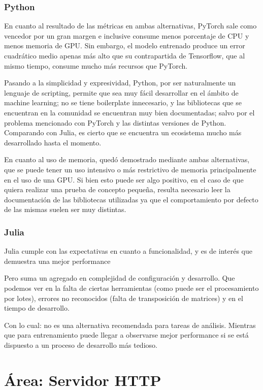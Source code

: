 \documentclass[11pt]{article}
\let\Oldsection\section
\renewcommand{\section}{\FloatBarrier\Oldsection}
\let\Oldsubsubsection\subsubsection
\renewcommand{\subsubsection}{\FloatBarrier\Oldsubsubsection}
\begin{document}
\subsubsection{Python}

En cuanto al resultado de las métricas en ambas alternativas, PyTorch sale como vencedor por un gran margen e inclusive consume menos porcentaje de CPU y menos memoria de GPU. Sin embargo, el modelo entrenado produce un error cuadrático medio apenas más alto que su contrapartida de Tensorflow, que al mismo tiempo, consume mucho más recursos que PyTorch.

Pasando a la simplicidad y expresividad, Python, por ser naturalmente un lenguaje de scripting, permite que sea muy fácil desarrollar en el ámbito de machine learning; no se tiene boilerplate innecesario, y las bibliotecas que se encuentran en la comunidad se encuentran muy bien documentadas; salvo por el problema mencionado con PyTorch y las distintas versiones de Python. Comparando con Julia, es cierto que se encuentra un ecosistema mucho más desarrollado hasta el momento.

En cuanto al uso de memoria, quedó demostrado mediante ambas alternativas, que se puede tener un uso intensivo o más restrictivo de memoria principalmente en el uso de una GPU. Si bien esto puede ser algo positivo, en el caso de que quiera realizar una prueba de concepto pequeña, resulta necesario leer la documentación de las bibliotecas utilizadas ya que el comportamiento por defecto de las mismas suelen ser muy distintas.

\subsubsection{Julia}

Julia cumple con las expectativas en cuanto a funcionalidad, y es de interés que demuestra una mejor performance

Pero suma un agregado en complejidad de configuración y desarrollo. Que podemos ver en la falta de ciertas herramientas (como puede ser el procesamiento por lotes), errores no reconocidos (falta de transposición de matrices) y en el tiempo de desarrollo.

Con lo cual: no es una alternativa recomendada para tareas de análisis. Mientras que para entrenamiento puede llegar a observarse mejor performance si se está dispuesto a un proceso de desarrollo más tedioso.

\newpage

\section{Área: Servidor HTTP}
\end{document}
